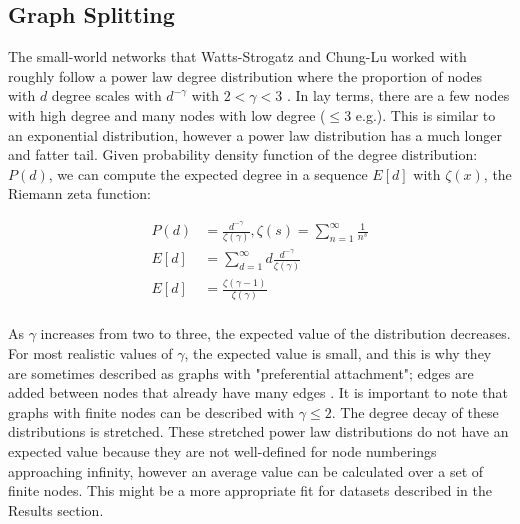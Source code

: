 \documentclass{article}
\begin{document}
\subsection{Graph Splitting}
The small-world networks that Watts-Strogatz and Chung-Lu worked with roughly follow a power law degree distribution where the proportion of nodes with $d$ degree scales with $d^{-\gamma}$ with $2 < \gamma < 3$ \cite{Chung:2004,Watts:1998}. In lay terms, there are a few nodes with high degree and many nodes with low degree ($\leq3$ e.g.). This is similar to an exponential distribution, however a power law distribution has a much longer and fatter tail. Given probability density function of the degree distribution: $P(d)$, we can compute the expected degree in a sequence $E[d]$ with $\zeta(x)$, the Riemann zeta function:\\
\begin{spacing}{1}
\begin{align*}
P(d) & = \frac{d^{-\gamma}}{\zeta(\gamma)},               \zeta(s) = \sum_{n=1}^{\infty} \frac{1}{n^s}\\
E[d] & = \sum_{d=1}^{\infty} d \frac{d^{-\gamma}}{\zeta(\gamma)} \\
E[d] & = \frac{\zeta(\gamma-1)}{\zeta(\gamma)}\\ 
\end{align*}
\end{spacing}
As $\gamma$ increases from two to three, the expected value of the distribution decreases. For most realistic values of $\gamma$, the expected value is small, and this is why they are sometimes described as graphs with "preferential attachment"; edges are added between nodes that already have many edges \cite{Watts:1998}. It is important to note that graphs with finite nodes can be described with $\gamma \leq 2$. The degree decay of these distributions is stretched. These stretched power law distributions do not have an expected value because they are not well-defined for node numberings approaching infinity, however an average value can be calculated over a set of finite nodes. This might be a more appropriate fit for datasets described in the Results section.\\
\end{document}
